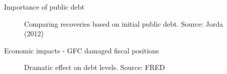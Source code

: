 \begin{frame}{Importance of public debt}

\begin{figure}
\begin{center}


\caption{Comparing recoveries based on initial public debt. Source: Jorda (2012)}

\end{center}
\end{figure}

\end{frame}



\begin{frame}{Economic impacts - GFC damaged fiscal positions}

\begin{figure}
\begin{center}


\caption{Dramatic effect on debt levels. Source: FRED}

\end{center}
\end{figure}

\end{frame}

